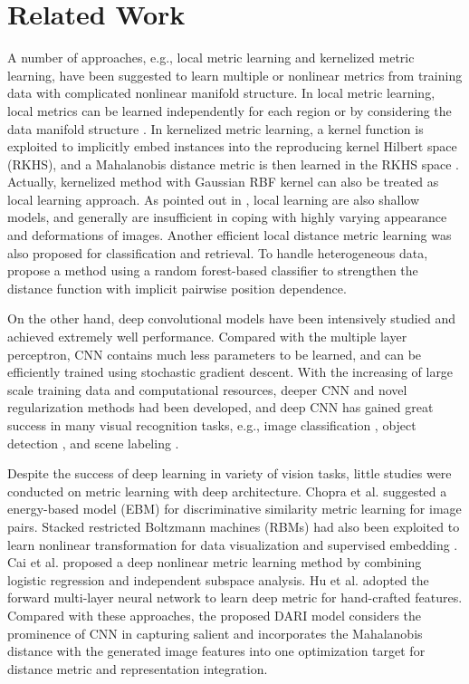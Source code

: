 \documentclass[letterpaper]{article}
\begin{document}
\section{Related Work}
A number of approaches, e.g., local metric learning and kernelized metric learning, have been suggested to learn multiple or nonlinear metrics from training data with complicated nonlinear manifold structure. In local metric learning, local metrics can be learned independently for each region or by considering the data manifold structure \cite{Noh2010GLML,Wang2012PLML,LMNN}. In kernelized metric learning, a kernel function is exploited to implicitly embed instances into the reproducing kernel Hilbert space (RKHS), and a Mahalanobis distance metric is then learned in the RKHS space \cite{Wang2011MKL}. Actually, kernelized method with Gaussian RBF kernel can also be treated as local learning approach. As pointed out in \cite{Bengio2009Survey}, local learning are also shallow models, and generally are insufficient in coping with highly varying appearance and deformations of images. Another efficient local distance metric learning \cite{yang2006efficient} was also proposed for classification and retrieval. To handle heterogeneous data, \cite{xiong2012random} propose a method  using a random forest-based classifier to strengthen the distance function with implicit pairwise position dependence.

On the other hand, deep convolutional models have been intensively studied and achieved extremely well performance. Compared with the multiple layer perceptron, CNN contains much less parameters to be learned, and can be efficiently trained using stochastic gradient descent. With the increasing of large scale training data and computational resources, deeper CNN and novel regularization methods had been developed, and deep CNN has gained great success in many visual recognition tasks, e.g., image classification \cite{Krizhevsky2012CNN}, object detection \cite{Szegedy2013Detection}, and scene labeling \cite{Pinheiro2014scene}.

Despite the success of deep learning in variety of vision tasks, little studies were conducted on metric learning with deep architecture. Chopra et al. \cite{Chopra2005ML_EBM} suggested a energy-based model (EBM) for discriminative similarity metric learning for image pairs. Stacked restricted Boltzmann machines (RBMs) had also been exploited to learn nonlinear transformation for data visualization and supervised embedding \cite{Min2010dt_RBM}. Cai et al. \cite{Cai2012ISA} proposed a deep nonlinear metric learning method by combining logistic regression and independent subspace analysis. Hu et al. \cite{Hu2014DDML} adopted the forward multi-layer neural network to learn deep metric for hand-crafted features. Compared with these approaches, the proposed DARI model considers the prominence of CNN in capturing salient and incorporates the Mahalanobis distance with the generated image features into one optimization target for distance metric and representation integration.
\end{document}
